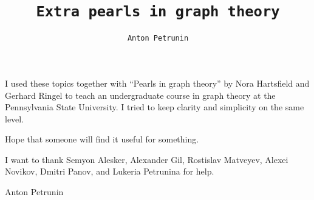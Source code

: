 \title{\tt Extra pearls in graph theory}
\author{\tt Anton Petrunin}
\date{}
\maketitle

I used these topics together with ``Pearls in graph theory'' by Nora Hartsfield and Gerhard Ringel \cite{hartsfield-ringel} to teach an undergraduate course in graph theory at the Pennsylvania State University.
I tried to keep clarity and simplicity on the same level.

Hope that someone will find it useful for something.

\medskip

I want to thank 
Semyon Alesker,
Alexander Gil,
Rostislav Matveyev,
Alexei Novikov,
Dmitri Panov,
and Lukeria Petrunina for help.

\begin{flushright}
Anton Petrunin
\end{flushright}

\null\vfill{}


\thispagestyle{empty}
\newpage
\tableofcontents
